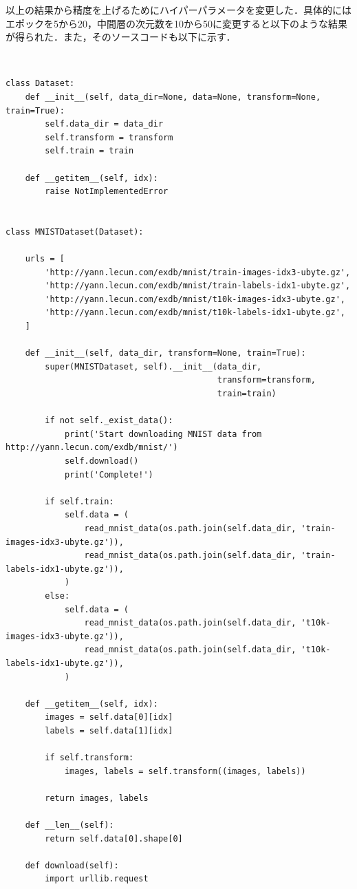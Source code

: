 \documentclass[11pt, a4paper]{jsarticle}
\begin{document}
  以上の結果から精度を上げるためにハイパーパラメータを変更した．具体的にはエポックを5から20，中間層の次元数を10から50に変更すると以下のような結果が得られた．また，そのソースコードも以下に示す．

　\begin{lstlisting}[basicstyle=\small, caption=Exercise~3.5, label=src:exercise3.5]
class Dataset:
    def __init__(self, data_dir=None, data=None, transform=None, train=True):
        self.data_dir = data_dir
        self.transform = transform
        self.train = train

    def __getitem__(self, idx):
        raise NotImplementedError


class MNISTDataset(Dataset):

    urls = [
        'http://yann.lecun.com/exdb/mnist/train-images-idx3-ubyte.gz',
        'http://yann.lecun.com/exdb/mnist/train-labels-idx1-ubyte.gz',
        'http://yann.lecun.com/exdb/mnist/t10k-images-idx3-ubyte.gz',
        'http://yann.lecun.com/exdb/mnist/t10k-labels-idx1-ubyte.gz',
    ]

    def __init__(self, data_dir, transform=None, train=True):
        super(MNISTDataset, self).__init__(data_dir,
                                           transform=transform,
                                           train=train)

        if not self._exist_data():
            print('Start downloading MNIST data from http://yann.lecun.com/exdb/mnist/')
            self.download()
            print('Complete!')

        if self.train:
            self.data = (
                read_mnist_data(os.path.join(self.data_dir, 'train-images-idx3-ubyte.gz')),
                read_mnist_data(os.path.join(self.data_dir, 'train-labels-idx1-ubyte.gz')),
            )
        else:
            self.data = (
                read_mnist_data(os.path.join(self.data_dir, 't10k-images-idx3-ubyte.gz')),
                read_mnist_data(os.path.join(self.data_dir, 't10k-labels-idx1-ubyte.gz')),
            )

    def __getitem__(self, idx):
        images = self.data[0][idx]
        labels = self.data[1][idx]

        if self.transform:
            images, labels = self.transform((images, labels))

        return images, labels

    def __len__(self):
        return self.data[0].shape[0]

    def download(self):
        import urllib.request


\end{lstlisting}
\end{document}
